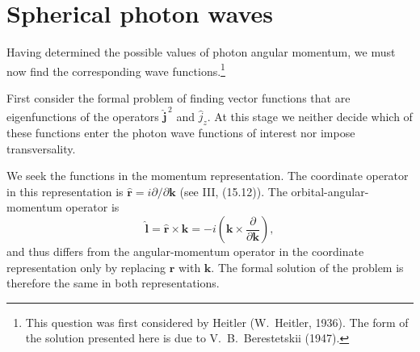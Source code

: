 \section{Spherical photon waves}

Having determined the possible values of photon angular momentum, we must now find the corresponding wave functions.\footnote{This question was first considered by Heitler (W.~Heitler, 1936). The form of the solution presented here is due to V.~B.~Berestetskii (1947).}

First consider the formal problem of finding vector functions that are eigenfunctions of the operators $\widehat{\mathbf j}^{\,2}$ and $\widehat j_z$. At this stage we neither decide which of these functions enter the photon wave functions of interest nor impose transversality.

We seek the functions in the momentum representation. The coordinate operator in this representation is $\widehat{\mathbf r}=i\partial/\partial\mathbf k$ (see III, (15.12)). The orbital-angular-momentum operator is
\[
\widehat{\mathbf l}=\widehat{\mathbf r}\times\mathbf k
=-i\left(\mathbf k\times\frac{\partial}{\partial\mathbf k}\right),
\]
and thus differs from the angular-momentum operator in the coordinate representation only by replacing $\mathbf r$ with $\mathbf k$. The formal solution of the problem is therefore the same in both representations.


